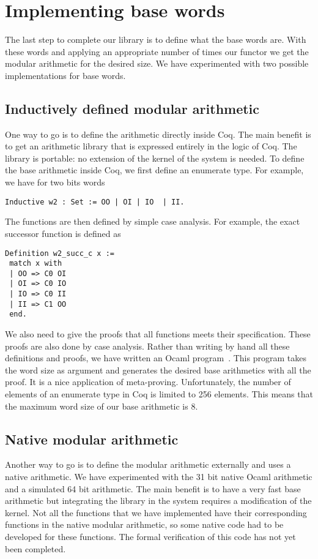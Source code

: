 \section{Implementing base words \label{word}}

The last step to complete our library is to define what the base words are. 
With these words and applying an appropriate number of times our functor
we get the modular arithmetic for the desired size. We have experimented
with two possible implementations for base words.

\subsection{Inductively defined modular arithmetic}

One way to go is to define the arithmetic directly inside {\sc Coq}.
The main benefit is to get an arithmetic library that is expressed entirely
in the logic of {\sc Coq}. The library is portable: no extension of the kernel 
of the system is needed. To define the base arithmetic inside {\sc Coq}, 
we first define an enumerate type. For example, we have for two bits words
\begin{verbatim}
Inductive w2 : Set := OO | OI | IO  | II.
\end{verbatim}
The functions are then defined by simple case analysis. For example,
the exact successor function is defined as
\begin{verbatim}
Definition w2_succ_c x :=
 match x with
 | OO => C0 OI
 | OI => C0 IO
 | IO => C0 II
 | II => C1 OO
 end.
\end{verbatim}
We also need to give the proofs that all functions meets their specification.
These proofs are also done by case analysis. 
Rather than writing by hand all these definitions and proofs, we have
written an {\sc Ocaml} program~\cite{ocaml}. This program takes the word
size as argument and generates the desired base arithmetics with all
the proof. It is a nice application of meta-proving. Unfortunately, the
number of elements of an enumerate type in {\sc Coq} is limited to 
256 elements. This means that the maximum word size of our base arithmetic
is 8.

\subsection{Native modular arithmetic}

Another way to go is to define the modular arithmetic externally and
uses a native arithmetic. We have experimented with the 31 bit native
{\sc Ocaml} arithmetic and a simulated 64 bit arithmetic. The main benefit
is to have a very fast base arithmetic but integrating the library in the
system requires a modification of the kernel. Not all the functions that
we have implemented have their corresponding functions in the native modular
arithmetic, so some native code had to be developed for these functions.
The formal verification of this code has not yet been completed.
